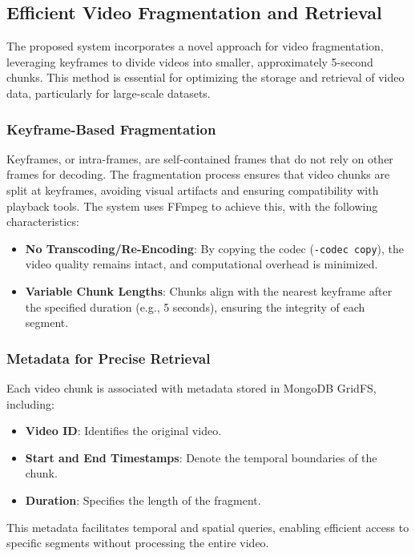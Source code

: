\documentclass[conference]{IEEEtran}
\begin{document}

\subsection{Efficient Video Fragmentation and Retrieval}

The proposed system incorporates a novel approach for video fragmentation, leveraging keyframes to divide videos into smaller, approximately 5-second chunks. This method is essential for optimizing the storage and retrieval of video data, particularly for large-scale datasets. 

\subsubsection{Keyframe-Based Fragmentation}
Keyframes, or intra-frames, are self-contained frames that do not rely on other frames for decoding. The fragmentation process ensures that video chunks are split at keyframes, avoiding visual artifacts and ensuring compatibility with playback tools. The system uses FFmpeg to achieve this, with the following characteristics:
\begin{itemize}
    \item \textbf{No Transcoding/Re-Encoding}: By copying the codec (\texttt{-codec copy}), the video quality remains intact, and computational overhead is minimized.
    \item \textbf{Variable Chunk Lengths}: Chunks align with the nearest keyframe after the specified duration (e.g., 5 seconds), ensuring the integrity of each segment.
\end{itemize}

\subsubsection{Metadata for Precise Retrieval}
Each video chunk is associated with metadata stored in MongoDB GridFS, including:
\begin{itemize}
    \item \textbf{Video ID}: Identifies the original video.
    \item \textbf{Start and End Timestamps}: Denote the temporal boundaries of the chunk.
    \item \textbf{Duration}: Specifies the length of the fragment.
\end{itemize}
This metadata facilitates temporal and spatial queries, enabling efficient access to specific segments without processing the entire video.
\end{document}

